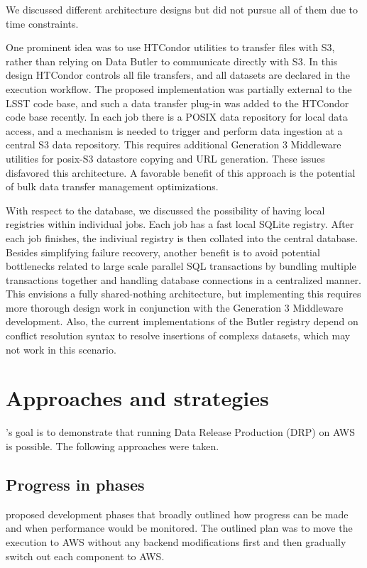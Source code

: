 We discussed different architecture designs but did not pursue all of them due to time constraints.

One prominent idea was to use HTCondor utilities to transfer files with S3, rather than relying on Data Butler to communicate directly with S3. In this design HTCondor controls all file transfers, and all datasets are declared in the execution workflow. The proposed implementation was partially external to the LSST code base, and such a data transfer plug-in was added to the HTCondor code base recently. In each job there is a POSIX data repository for local data access, and a mechanism is needed to trigger and perform data ingestion at a central S3 data repository. This requires additional Generation 3 Middleware utilities for posix-S3 datastore copying and URL generation. These issues disfavored this architecture. A favorable benefit of this approach is the potential of bulk data transfer management optimizations.

With respect to the database, we discussed the possibility of having local registries within individual jobs.
Each job has a fast local SQLite registry.
After each job finishes, the indiviual registry is then collated into the central database.
Besides simplifying failure recovery, another benefit is to avoid potential bottlenecks related to large scale parallel SQL transactions by bundling multiple transactions together and handling database connections in a centralized manner.
This envisions a fully shared-nothing architecture, but implementing this requires more thorough design work in conjunction with the Generation 3 Middleware development.
Also, the current implementations of the Butler registry depend on conflict resolution syntax to resolve insertions of complexs datasets, which may not work in this scenario.


\section{Approaches and strategies}

\poc's goal is to demonstrate that running Data Release Production (DRP) on AWS is possible.
The following approaches were taken.

\subsection{Progress in phases}

 proposed development phases that broadly outlined how progress can be made and when performance would be monitored. The outlined plan was to move the execution to AWS without any backend modifications first and then gradually switch out each component to AWS.

